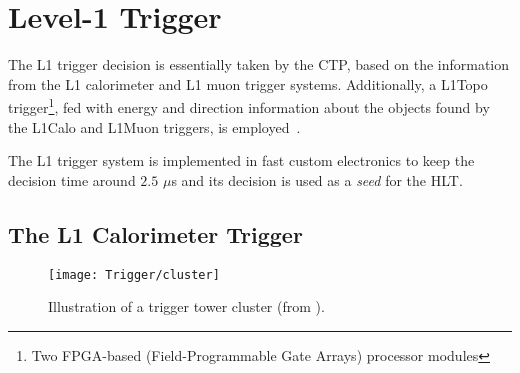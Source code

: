 

		
	\section{Level-1 Trigger}
	\label{sec:L1}

		The \ac{L1} trigger decision is essentially taken by the \ac{CTP}, based on the information from the \ac{L1} calorimeter and \ac{L1} muon trigger systems. Additionally, a \ac{L1Topo} trigger\footnote{Two FPGA-based (Field-Programmable Gate Arrays) processor modules}, fed with energy and direction information about the objects found by the \ac{L1Calo} and \ac{L1Muon} triggers, is employed~\cite{ATLASJINST,ATLASTrigger2015,ATLASL1Topo}.

		The \ac{L1} trigger system is implemented in fast custom electronics to keep the decision time around $2.5$ $\mu$s and its decision is used as a \emph{seed} for the \ac{HLT}. 


		\subsection*{The L1 Calorimeter Trigger}

			\begin{wrapfigure}{R}{.5\textwidth}
				\centering
				\texttt{[image: Trigger/cluster]}
				\caption{\label{fig:calo_cluster} Illustration of a trigger tower cluster (from \cite{ATLASTrigger2010}).}
			\end{wrapfigure}

